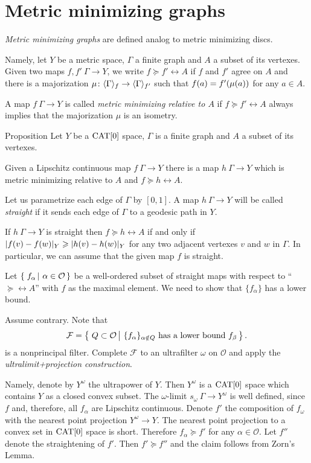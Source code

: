 \section{Metric minimizing graphs}\label{Metric minimizing graphs}

\emph{Metric minimizing graphs} are defined analog to metric minimizing discs.

Namely, let $Y$ be a metric space, $\Gamma$ a finite graph and $A$ a subset of its vertexes.
Given two maps $f,f'\:\Gamma\to Y$, we write $f\succcurlyeq f'\rel A$ if $f$ and $f'$ agree on $A$ 
and there is a majorization $\mu\colon\langle\Gamma\rangle_f\to \langle\Gamma\rangle_{f'}$
such that $f(a)\zz=f'(\mu(a))$ for any $a\in A$.

A map $f\:\Gamma\to Y$ is called \emph{metric minimizing relative to $A$} if $f\succcurlyeq f'\rel A$ always implies that the majorization $\mu$ is an isometry.

\begin{thm}{Proposition}\label{prop:metric-min-graph-exist}
Let $Y$ be a $\mathop{\rm CAT}\nolimits[0]$ space, 
$\Gamma$ is a finite graph and $A$ a subset of its vertexes.

Given a Lipschitz continuous map $f\:\Gamma\to Y$ there is a map $h\:\Gamma\to Y$ 
which is metric minimizing relative to $A$ and $f\succcurlyeq h\rel A$.
\end{thm}

Let us parametrize each edge of $\Gamma$ by $[0,1]$.
A map $h\:\Gamma\to Y$ will be called \emph{straight} if it
sends each edge of $\Gamma$ to a geodesic path in $Y$.

If $h\:\Gamma\to Y$ is straight then $f\succcurlyeq h\rel A$ if and only if 
$|f(v)-f(w)|_Y\zz\ge |h(v)-h(w)|_Y$
for any two adjacent vertexes $v$ and $w$ in $\Gamma$.
In particular, we can assume that the given map $f$ is straight.

Let $\set{f_\alpha}{\alpha\in \mathcal{O}}$ be a well-ordered subset of straight maps with respect to ``$\succcurlyeq\rel A$'' 
with $f$ as the maximal element. 
We need to show that $\{f_\alpha\}$ has a lower bound.

Assume contrary.
Note that
$$
\mathcal{F}
=
\set{Q\subset\mathcal{O}}{\{f_\alpha\}_{\alpha\notin Q}\text{ has a lower bound } f_\beta}.
$$
is a nonprincipal filter.
Complete $\mathcal{F}$ to an ultrafilter $\omega$ on $\mathcal{O}$ and apply the \emph{ultralimit+projection construction}.

Namely, denote by $Y^\omega$ the ultrapower of $Y$. 
Then $Y^\omega$
is a $\mathop{\rm CAT}\nolimits[0]$ space which contains $Y$ as a closed convex subset. 
The $\omega$-limit $s_\omega\:\Gamma\to Y^\omega$ is well defined, since
$f$ and, therefore, all $f_\alpha$ are Lipschitz continuous. 
Denote $f'$ the composition of $f_\omega$ with the nearest point projection $Y^\omega\to Y$.
The nearest point projection to a convex set in $\mathop{\rm CAT}\nolimits[0]$ space is short.
Therefore $f_\alpha\succcurlyeq f'$ for any $\alpha\in \mathcal{O}$. Let $f''$ denote the straightening of $f'$.
Then $f'\succcurlyeq f''$ and the claim follows from Zorn's Lemma.
\qeds



